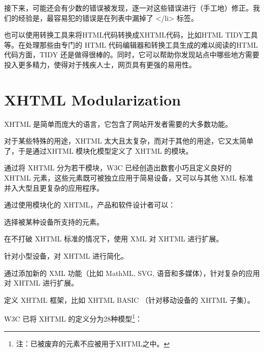 接下来，可能还会有少数的错误被发现，逐一对这些错误进行（手工地）修正。我们的经验是，最容易犯的错误是在列表中漏掉了 </li> 标签。

也可以使用转换工具来将HTML代码转换成XHTML代码，比如HTML TIDY工具等。在处理那些由专门的 HTML 代码编辑器和转换工具生成的难以阅读的HTML代码方面，TIDY 还是做得很棒的。同时，它可以帮助你发现站点中哪些地方需要投入更多精力，使得对于残疾人士，网页具有更强的易用性。














\chapter{XHTML Modularization}


XHTML 是简单而庞大的语言，它包含了网站开发者需要的大多数功能。

对于某些特殊的用途，XHTML 太大且太复杂，而对于其他的用途，它又太简单了，于是通过XHTML 模块化模型定义了 XHTML 的模块。

通过将 XHTML 分为若干模块，W3C 已经创造出数套小巧且定义良好的 XHTML 元素，这些元素既可被独立应用于简易设备，又可以与其他 XML 标准并入大型且更复杂的应用程序。

通过使用模块化的 XHTML，产品和软件设计者可以：

\begin{compactitem}
\item 选择被某种设备所支持的元素。
\item 在不打破 XHTML 标准的情况下，使用 XML 对 XHTML 进行扩展。
\item 针对小型设备，对 XHTML 进行简化。
\item 通过添加新的 XML 功能（比如 MathML, SVG, 语音和多媒体），针对复杂的应用对 XHTML 进行扩展。
\item 定义 XHTML 框架，比如 XHTML BASIC （针对移动设备的 XHTML 子集）。
\end{compactitem}

W3C 已将 XHTML 的定义分为28种模型\footnote{注：已被废弃的元素不应被用于XHTML之中。}：

